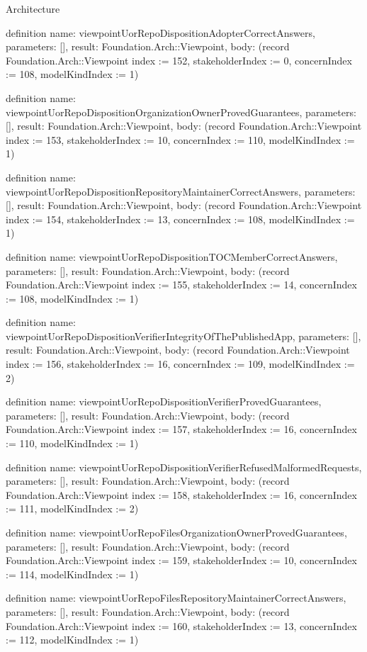 \begin{lexlean}{Architecture}
\begin{semanticmodule}
definition{
  name: viewpointUorRepoDispositionAdopterCorrectAnswers,
  parameters: [],
  result: Foundation.Arch::Viewpoint,
  body: (record Foundation.Arch::Viewpoint {index := 152, stakeholderIndex := 0, concernIndex := 108, modelKindIndex := 1})
}

definition{
  name: viewpointUorRepoDispositionOrganizationOwnerProvedGuarantees,
  parameters: [],
  result: Foundation.Arch::Viewpoint,
  body: (record Foundation.Arch::Viewpoint {index := 153, stakeholderIndex := 10, concernIndex := 110, modelKindIndex := 1})
}

definition{
  name: viewpointUorRepoDispositionRepositoryMaintainerCorrectAnswers,
  parameters: [],
  result: Foundation.Arch::Viewpoint,
  body: (record Foundation.Arch::Viewpoint {index := 154, stakeholderIndex := 13, concernIndex := 108, modelKindIndex := 1})
}

definition{
  name: viewpointUorRepoDispositionTOCMemberCorrectAnswers,
  parameters: [],
  result: Foundation.Arch::Viewpoint,
  body: (record Foundation.Arch::Viewpoint {index := 155, stakeholderIndex := 14, concernIndex := 108, modelKindIndex := 1})
}

definition{
  name: viewpointUorRepoDispositionVerifierIntegrityOfThePublishedApp,
  parameters: [],
  result: Foundation.Arch::Viewpoint,
  body: (record Foundation.Arch::Viewpoint {index := 156, stakeholderIndex := 16, concernIndex := 109, modelKindIndex := 2})
}

definition{
  name: viewpointUorRepoDispositionVerifierProvedGuarantees,
  parameters: [],
  result: Foundation.Arch::Viewpoint,
  body: (record Foundation.Arch::Viewpoint {index := 157, stakeholderIndex := 16, concernIndex := 110, modelKindIndex := 1})
}

definition{
  name: viewpointUorRepoDispositionVerifierRefusedMalformedRequests,
  parameters: [],
  result: Foundation.Arch::Viewpoint,
  body: (record Foundation.Arch::Viewpoint {index := 158, stakeholderIndex := 16, concernIndex := 111, modelKindIndex := 2})
}

definition{
  name: viewpointUorRepoFilesOrganizationOwnerProvedGuarantees,
  parameters: [],
  result: Foundation.Arch::Viewpoint,
  body: (record Foundation.Arch::Viewpoint {index := 159, stakeholderIndex := 10, concernIndex := 114, modelKindIndex := 1})
}

definition{
  name: viewpointUorRepoFilesRepositoryMaintainerCorrectAnswers,
  parameters: [],
  result: Foundation.Arch::Viewpoint,
  body: (record Foundation.Arch::Viewpoint {index := 160, stakeholderIndex := 13, concernIndex := 112, modelKindIndex := 1})
}


\end{semanticmodule}
\end{lexlean}
